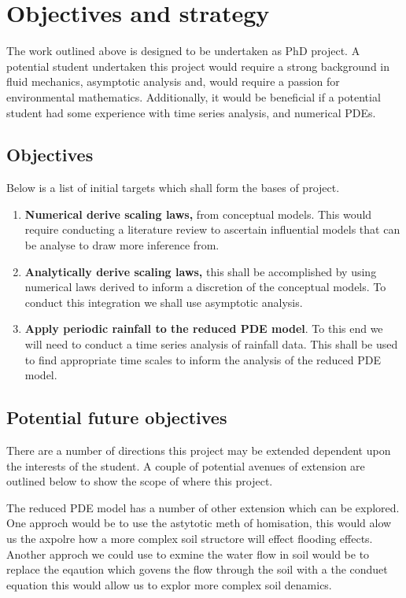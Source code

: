 \documentclass[11pt]{article}
\begin{document}
\section{Objectives and strategy}

The work outlined above is designed to be undertaken as PhD project. A potential student undertaken this project would require a strong background in fluid mechanics, asymptotic analysis and, would require a passion for environmental mathematics. 
Additionally, it would be beneficial if a potential student had some experience with time series analysis, and numerical PDEs.

\subsection{Objectives}
Below is a list of initial targets which shall form the bases of project.

\begin{enumerate}
    \item \textbf{Numerical derive scaling laws,} from conceptual models. This would require conducting a literature review to ascertain influential models that can be analyse to draw more inference from.
    \item \textbf{Analytically derive scaling laws,} this shall be accomplished by using numerical laws derived to inform a discretion of the conceptual models. To conduct this integration we shall use asymptotic analysis.
    \item \textbf{Apply periodic rainfall to the reduced PDE model}. To this end we will need to conduct a time series analysis of rainfall data. This shall be used to find appropriate time scales to inform the analysis of the reduced PDE model.
\end{enumerate}

\subsection{Potential future objectives}

There are a number of directions this project may be extended dependent upon the interests of the student. A couple of potential avenues of extension are outlined below to show the scope of where this project.

The reduced PDE model has a number of other extension which can be explored. One approch would be to use the astytotic meth of homisation, this would alow us the axpolre how a more complex soil structore will effect flooding effects. Another approch we could use to exmine the water flow in soil would be to replace the eqaution which govens the flow through the soil with a the conduet equation this would allow us to explor more complex soil denamics.
\end{document}
